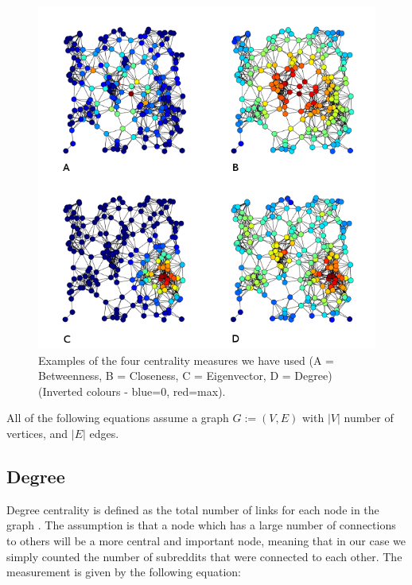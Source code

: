\documentclass[bsc,frontabs,twoside,singlespacing,parskip,deptreport]{infthesis}
\begin{document}
\begin{center}
	\begin{figure}[!htb]\label{graph}
		\centering
 		\includegraphics[width=\textwidth]{centrality_measures.png}
  		\caption{Examples of the four centrality measures we have used (A = Betweenness, B = Closeness, C = Eigenvector, D = Degree) (Inverted colours - blue=0, red=max). \cite{fig:centrality-examples}}
  		\label{fig:centrality}
	\end{figure}	
\end{center}

All of the following equations assume a graph $G := ( V , E )$ with $|V|$ number of vertices, and $|E|$ edges.

\subsection{Degree}

Degree centrality is defined as the total number of links for each node in the graph \cite{erdos}. The assumption is that a node which has a large number of connections to others will be a more central and important node, meaning that in our case we simply counted the number of subreddits that were connected to each other. The measurement is given by the following equation:
\end{document}
